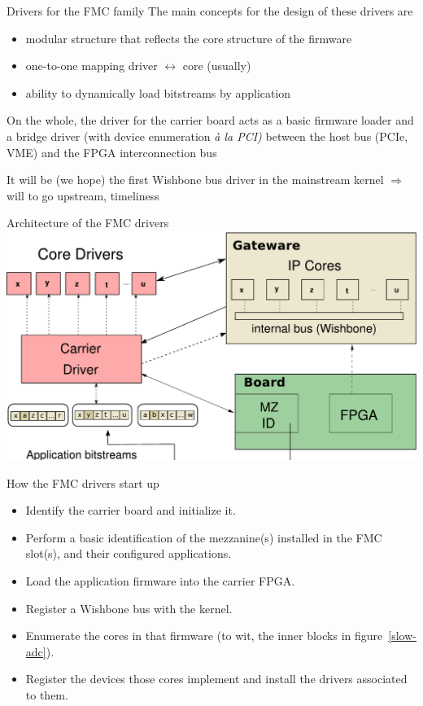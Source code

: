 \documentclass[compress,red]{beamer}
\begin{document}
\begin{frame}{Drivers for the FMC family}
The main concepts for the design of these drivers are
\begin{itemize}
\pause
\item modular structure that reflects the core structure of the firmware
\pause
\item one-to-one mapping driver $\leftrightarrow$ core (usually)
\pause
\item ability to dynamically load bitstreams by application
\end{itemize}

\pause
On the whole, the driver for the carrier board acts as a basic firmware
loader and a bridge driver (with device enumeration
\emph{\`a la PCI)} between the host bus (PCIe, VME) and the FPGA
interconnection bus

\pause
It will be (we hope) the first Wishbone bus driver in the mainstream
kernel $\Rightarrow$ will to go upstream, timeliness
\end{frame}


\begin{frame}{Architecture of the FMC drivers}
\includegraphics[height=0.8\textheight]{driverarch.pdf}
\end{frame}

\begin{frame}{How the FMC drivers start up}
\begin{itemize}
\item Identify the carrier board and initialize it.
\item Perform a basic identification of the mezzanine(s) installed in
    the FMC slot(s), and their configured applications.
\item Load the application firmware into the carrier FPGA.
\item Register a Wishbone bus with the kernel.
\item Enumerate the cores in that firmware (to wit, the
    inner blocks in figure~\ref{slow-adc}).
\item Register the devices those cores implement and install the drivers
    associated to them.
\end{itemize}
\end{frame}
\end{document}

